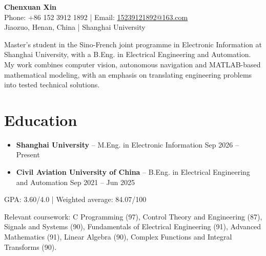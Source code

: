 \documentclass[10pt,a4paper]{article}
\begin{document}
\fontsize{9.2}{10.8}\selectfont

\begin{center}
  {\LARGE\bfseries Chenxuan Xin}\\[5pt]
  {\small
    Phone: +86 152 3912 1892 \quad | \quad
    Email: \href{mailto:15239121892@163.com}{15239121892@163.com}}\\[2pt]
  {\small Jiaozuo, Henan, China \quad | \quad Shanghai University}
\end{center}

\vspace{3pt}
Master's student in the Sino-French joint programme in Electronic Information at
Shanghai University, with a B.Eng. in Electrical Engineering and Automation.
My work combines computer vision, autonomous navigation and MATLAB-based
mathematical modeling, with an emphasis on translating engineering problems into
tested technical solutions.

\section{Education}
\begin{itemize}
  \item \textbf{Shanghai University} -- M.Eng. in Electronic Information
        \hfill Sep 2026 -- Present
  \item \textbf{Civil Aviation University of China} -- B.Eng. in Electrical
        Engineering and Automation \hfill Sep 2021 -- Jun 2025
\end{itemize}

GPA: 3.60/4.0 \quad | \quad Weighted average: 84.07/100

Relevant coursework: C Programming (97), Control Theory and Engineering (87),
Signals and Systems (90), Fundamentals of Electrical Engineering (91), Advanced
Mathematics (91), Linear Algebra (90), Complex Functions and Integral Transforms
(90).
\end{document}
